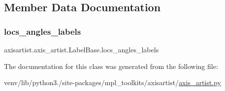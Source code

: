 \subsection{Member Data Documentation}
\mbox{\label{classaxisartist_1_1axis__artist_1_1LabelBase_a248e47dade66bd92b38eef037a4c58a1}} 
\subsubsection{\texorpdfstring{locs\+\_\+angles\+\_\+labels}{locs\_angles\_labels}}
{\footnotesize\ttfamily axisartist.\+axis\+\_\+artist.\+Label\+Base.\+locs\+\_\+angles\+\_\+labels}



The documentation for this class was generated from the following file\+:\begin{DoxyCompactItemize}
\item 
venv/lib/python3./site-\/packages/mpl\+\_\+toolkits/axisartist/\hyperlink{axisartist_2axis__artist_8py}{axis\+\_\+artist.\+py}\end{DoxyCompactItemize}
